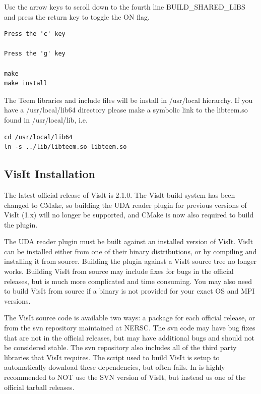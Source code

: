 \documentclass[12pt]{article}
\begin{document}
Use the arrow keys to scroll down to the fourth line
BUILD\_SHARED\_LIBS and press the return key to toggle the ON flag.

\begin{verbatim}
Press the 'c' key

Press the 'g' key

make
make install
\end{verbatim}
The Teem libraries and include files will be install in /usr/local
hierarchy.  If you have a /usr/local/lib64 directory please make a
symbolic link to the libteem.so found in /usr/local/lib, i.e.

\begin{verbatim}
cd /usr/local/lib64
ln -s ../lib/libteem.so libteem.so
\end{verbatim}

\subsection{VisIt Installation}

The latest official release of VisIt is 2.1.0.  The VisIt build system
has been changed to CMake, so building the UDA reader plugin for
previous versions of VisIt (1.x) will no longer be supported, and
CMake is now also required to build the plugin.

The UDA reader plugin must be built against an installed version of
VisIt.  VisIt can be installed either from one of their binary
distributions, or by compiling and installing it from source.
Building the plugin against a VisIt source tree no longer works.
Building VisIt from source may include fixes for bugs in the official
releases, but is much more complicated and time consuming.  You may
also need to build VisIt from source if a binary is not provided for
your exact OS and MPI versions.

The VisIt source code is available two ways: a package for each
official release, or from the svn repository maintained at NERSC.  The
svn code may have bug fixes that are not in the official releases, but
may have additional bugs and should not be considered stable.  The svn
repository also includes all of the third party libraries that VisIt
requires.  The script used to build VisIt is setup to automatically
download these dependencies, but often fails.  In is highly
recommended to NOT use the SVN version of VisIt, but instead us one of
the official tarball releases.
\end{document}
